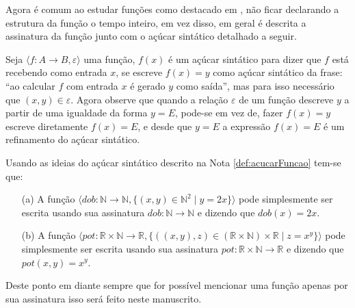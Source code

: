 Agora é comum ao estudar funções como destacado em \cite{carmo2013}, não ficar declarando a estrutura da função o tempo inteiro, em vez disso, em geral é descrita a assinatura da função junto com o açúcar sintático detalhado a seguir.

\begin{note}\label{def:acucarFuncao}
	Seja  $\langle f: A \rightarrow B, \varepsilon \rangle$ uma função, $f(x)$ é um açúcar sintático para dizer que $f$ está recebendo como entrada $x$, se escreve $f(x) = y$ como açúcar sintático da frase: ``ao calcular $f$ com entrada $x$ é gerado $y$ como saída'', mas para isso necessário que $(x, y) \in \varepsilon$. Agora observe que quando a relação $\varepsilon$ de um função descreve $y$ a partir de uma igualdade da forma $y = E$, pode-se em vez de, fazer $f(x) = y$ escreve diretamente $f(x) = E$, e desde que $y = E$ a expressão $f(x) = E$ é um refinamento do açúcar sintático.
\end{note}

\begin{example}
	Usando as ideias do açúcar sintático descrito na Nota \ref{def:acucarFuncao} tem-se que:
	\begin{itemize}
		\item[(a)] A função  $\langle dob: \mathbb{N} \rightarrow  \mathbb{N},  \{(x, y) \in \mathbb{N}^2 \mid  y = 2x\} \rangle$ pode simplesmente ser escrita usando sua assinatura $dob:\mathbb{N} \rightarrow  \mathbb{N}$ e dizendo que $dob(x) = 2x$.
		\item[(b)] A função  $\langle pot: \mathbb{R} \times \mathbb{N} \rightarrow  \mathbb{R},  \{((x, y), z) \in (\mathbb{R} \times \mathbb{N}) \times \mathbb{R} \mid  z = x^y\} \rangle$ pode simplesmente ser escrita usando sua assinatura $pot: \mathbb{R} \times \mathbb{N} \rightarrow  \mathbb{R}$ e dizendo que $pot(x, y) = x^y$.
	\end{itemize}
\end{example}

\begin{remark}
	Deste ponto em diante sempre que for possível mencionar uma função apenas por sua assinatura isso será feito neste manuscrito.
\end{remark}

